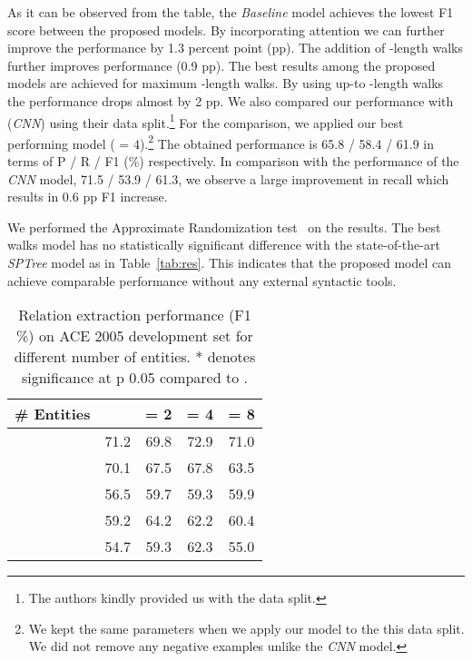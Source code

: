 \documentclass[11pt,a4paper]{article}
\begin{document}
    As it can be observed from the table, the \textit{Baseline} model achieves the lowest F1 score between the proposed models. 
    By incorporating attention we can further improve the performance by 1.3 percent point (pp). 
    The addition of -length walks further improves performance (0.9 pp).
    The best results among the proposed models are achieved for maximum -length walks.
    By using up-to -length walks the performance drops almost by 2 pp.  
    We also compared our performance with \citet{nguyen2015perspective} (\textit{CNN}) using their data split.\footnote{The authors kindly provided us with the data split.} For the comparison, we applied our best performing model ( = 4).\footnote{We kept the same parameters when we apply our model to the this data split. We did not remove any negative examples unlike the \textit{CNN} model.}
    The obtained performance is 65.8 / 58.4 / 61.9 in terms of P / R / F1 (\%) respectively. 
    In comparison with the performance of the \textit{CNN} model, 71.5 / 53.9 / 61.3, we observe a large improvement in recall which results in 0.6 pp F1 increase.
    
    We performed the Approximate Randomization test~\cite{noreen1989computer} on the results. The best walks model has no statistically significant difference with the state-of-the-art \textit{SPTree} model as in Table~\ref{tab:res}. This indicates that the proposed model can achieve comparable performance without any external syntactic tools.
    
    \begin{table}[t!]
		\centering
		\renewcommand*{\arraystretch}{1.1}
		\begin{tabular}{|lcccc|}
			\hline
			\# Entities &  &  = 2 &  = 4 &  = 8 \\
			\hline \hline 
 					    & 71.2 & 69.8 			 & 72.9            & 71.0 \\
 			 	    & 70.1 & 67.5 			 & 67.8            & 63.5\rlap{} \\ 
              	& 56.5 & 59.7 			 & 59.3            & 59.9 \\
               & 59.2 & 64.2\rlap{} & 62.2            & 60.4 \\
              & 54.7 & 59.3            & 62.3\rlap{} & 55.0 \\
			\hline
		\end{tabular}
		\caption{Relation extraction performance (F1 \%) on ACE 2005 development set for different number of entities. * denotes significance at p  0.05 compared to .} 
        \label{tab:anal}
	\end{table}
    
\end{document}
